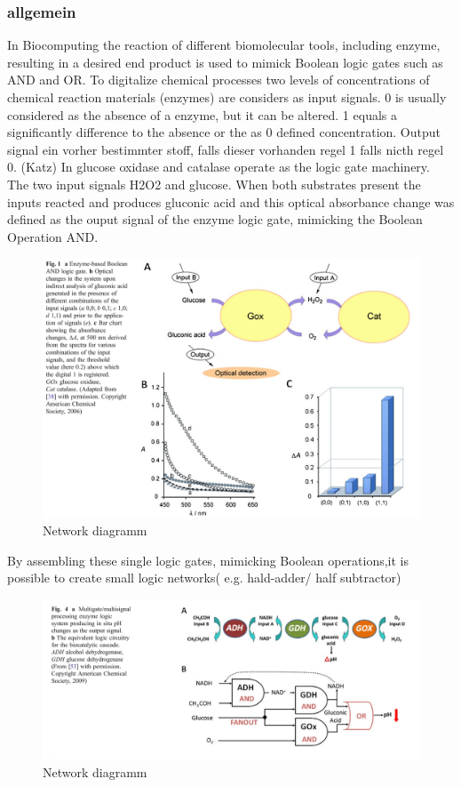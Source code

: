 \documentclass[runningheads]{llncs}
\begin{document}
	\subsubsection{allgemein}
	In Biocomputing the reaction of different biomolecular tools, including enzyme, resulting in a desired end product is used to mimick Boolean logic gates such as AND and OR. To digitalize chemical processes two levels of concentrations of chemical reaction materials (enzymes) are considers as input signals. 0 is usually considered as the absence of a enzyme, but it can be altered. 1 equals a  significantly difference to the absence or the as 0 defined concentration. 
	Output signal ein vorher bestimmter stoff, falls dieser vorhanden regel 1 falls nicth regel 0.  
	(Katz) 
	In \label{img:and} glucose oxidase and catalase operate as the logic gate machinery. The two input signals H2O2 and glucose. When both substrates present the inputs reacted and produces gluconic acid and this optical absorbance change was defined as the ouput signal of the enzyme logic gate, mimicking the Boolean Operation AND. 

	\begin{figure} \centering \includegraphics[scale= 0.3]{AND.png} \caption{Network diagramm} \label{img:and} \end{figure}
	By assembling these single logic gates, mimicking Boolean operations,it is possible to create small logic networks( e.g. hald-adder/ half subtractor)
	
	
	\begin{figure} \centering \includegraphics[scale= 0.2]{biocomputing_sensor.png} \caption{Network diagramm} \label{img:grafik-test} \end{figure}
	
\end{document}
